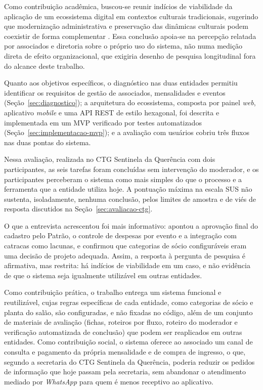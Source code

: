 \documentclass[12pt,a4paper]{article}
\begin{document}
Como contribuição acadêmica, buscou-se reunir indícios de viabilidade da aplicação de um ecossistema
digital em contextos culturais tradicionais, sugerindo que modernização administrativa e preservação
das dinâmicas culturais podem coexistir de forma complementar \parencite{hinings2018,vial2019}. Essa
conclusão apoia-se na percepção relatada por associados e diretoria sobre o próprio uso do sistema,
não numa medição direta de efeito organizacional, que exigiria desenho de pesquisa longitudinal fora
do alcance deste trabalho.

Quanto aos objetivos específicos, o diagnóstico nas duas entidades permitiu identificar os requisitos
de gestão de associados, mensalidades e eventos (Seção~\ref{sec:diagnostico}); a arquitetura do
ecossistema, composta por painel \textit{web}, aplicativo \textit{mobile} e uma API REST de estilo
hexagonal, foi descrita e implementada em um MVP verificado por testes automatizados
(Seção~\ref{sec:implementacao-mvp}); e a avaliação com usuários cobriu três fluxos nas duas pontas do
sistema.

Nessa avaliação, realizada no CTG Sentinela da Querência com dois participantes, as seis
tarefas foram concluídas sem intervenção do moderador, e os participantes perceberam o sistema como
mais simples do que o processo e a ferramenta que a entidade utiliza hoje. A pontuação máxima na
escala SUS não sustenta, isoladamente, nenhuma conclusão, pelos limites de amostra e de viés de
resposta discutidos na Seção~\ref{sec:avaliacao-ctg}.

O que a entrevista acrescentou foi mais
informativo: apontou a aprovação final do cadastro pelo Patrão, o controle de despesas por evento e a
integração com catracas como lacunas, e confirmou que categorias de sócio configuráveis eram uma
decisão de projeto adequada. Assim, a resposta à pergunta de pesquisa é afirmativa, mas restrita: há
indícios de viabilidade em um caso, e não evidência de que o sistema seja igualmente utilizável em
outras entidades.

Como contribuição prática, o trabalho entrega um sistema funcional e reutilizável, cujas regras
específicas de cada entidade, como categorias de sócio e planta do salão, são configuradas, e não
fixadas no código, além de um conjunto de materiais de avaliação (fichas, roteiros por fluxo, roteiro
do moderador e verificação automatizada de conclusão) que podem ser reaplicados em outras entidades.
Como contribuição social, o sistema oferece ao associado um canal de consulta e pagamento da própria
mensalidade e de compra de ingresso, o que, segundo a secretaria do CTG Sentinela da Querência,
poderia reduzir os pedidos de informação que hoje passam pela secretaria, sem abandonar o atendimento
mediado por \textit{WhatsApp} para quem é menos receptivo ao aplicativo.
\end{document}
